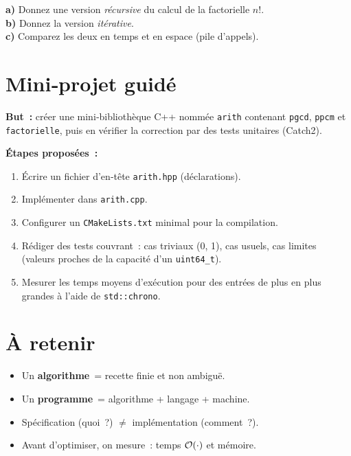 \begin{exercice}
\textbf{a)} Donnez une version \emph{récursive} du calcul de la factorielle
\(n!\).\\
\textbf{b)} Donnez la version \emph{itérative}.\\
\textbf{c)} Comparez les deux en temps et en espace (pile d’appels).
\end{exercice}

\section{Mini‑projet guidé}

\begin{tp}
\textbf{But :} créer une mini‑bibliothèque C++ nommée \texttt{arith} contenant
\texttt{pgcd}, \texttt{ppcm} et \texttt{factorielle}, puis en vérifier la
correction par des tests unitaires (Catch2).

\textbf{Étapes proposées :}
\begin{enumerate}
  \item Écrire un fichier d’en‑tête \texttt{arith.hpp} (déclarations).
  \item Implémenter dans \texttt{arith.cpp}.
  \item Configurer un \texttt{CMakeLists.txt} minimal pour la compilation.
  \item Rédiger des tests couvrant : cas triviaux (0, 1), cas usuels, cas
        \og limites \fg{} (valeurs proches de la capacité d’un \texttt{uint64\_t}).
  \item Mesurer les temps moyens d’exécution pour des entrées de plus en plus
        grandes à l’aide de \texttt{std::chrono}.
\end{enumerate}
\end{tp}

\section*{À retenir}
\begin{itemize}
  \item Un \textbf{algorithme} = recette finie et non ambiguë.
  \item Un \textbf{programme} = algorithme + langage + machine.
  \item Spécification (\og quoi ?\fg) \emph{$\neq$} implémentation (\og comment ?\fg).
  \item Avant d’optimiser, on mesure : temps $\mathcal{O}(\cdot)$ et mémoire.
\end{itemize}

